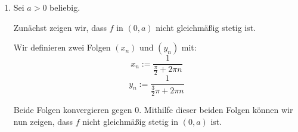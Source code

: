 \documentclass[a4paper,12pt]{article}
\begin{document}
\begin{enumerate}[label=\alph*)]
          Daraus folgt, dass für alle $n \in \mathbb{N}$ $f_n$ in $[0, +\infty)$ streng monoton ist.

          Wegen der strengen Monotonie von $f_{n}$ ist die Lösung $f_n(x_n) = 1$ eindeutig für alle $n \in \mathbb{N}$.
          
          \bigskip

          Nun ist noch der Grenzwert von $(x_n)$ zu bestimmen.

          Wir betrachten die Folge $(1 + f_n(x_n))$. Da jedes $1 + f_n$ eine geometrische Summe ist, gilt:
          \[
              1 + f_n(x_n) = \frac{1 - x_n^n}{1 - x_n}.
          \]

          Die Folge $(x_n^n)$ konvergiert gegen $0$, da $\sum_{n=0}^{\infty} x_n \leq \sum_{n=0}^{\infty} x_2^n$ und $\sum_{n=0}^{\infty} x_2^n$ konvergiert, weil es sich um eine geometrische Reihe handelt.
          Also gilt:

          \[
              \lim_{n \to \infty} 1 + f_n(x_n) = \lim_{n \to \infty} \sum_{k=0}^{n} (x_n)^k = \frac{1 - \lim_{n \to \infty} x_n^n}{1 - \lim_{n \to \infty} x_n} = \frac{1}{1 - \lim_{n \to \infty} x_n}
          \]

          \bigskip

          Außerdem haben wir jedes $x_n$ eben so gewählt, dass $f_n(x_n) = 1$ gilt. Also gilt ebenfalls:
          \[
              \lim_{n \to \infty} 1 + f_n(x_n) = 2.
          \]

          Da ein Grenzwert eindeutig ist, muss gelten:
          \[
              2 = \lim_{n \to \infty} f_n(x_n) = \frac{1}{1 - \lim_{n \to \infty} x_n}
          \]

          Folglich gilt $\lim_{n \to \infty} x_n = \frac{1}{2}$, was zu zeigen war.

          \bigskip

    \item

          Sei $a > 0$ beliebig.

          Zunächst zeigen wir, dass $f$ in $(0, a)$ nicht gleichmäßig stetig ist.

          Wir definieren zwei Folgen $(x_n)$ und $(y_n)$ mit:
          \[
              x_n := \frac{1}{\frac{\pi}{2} + 2\pi n}
          \]
          \[
              y_n := \frac{1}{\frac{3}{2}\pi + 2\pi n}
          \]

          Beide Folgen konvergieren gegen $0$. Mithilfe dieser beiden Folgen können wir nun zeigen, dass $f$ nicht gleichmäßig stetig in $(0, a)$ ist.


\end{enumerate}
\end{document}

